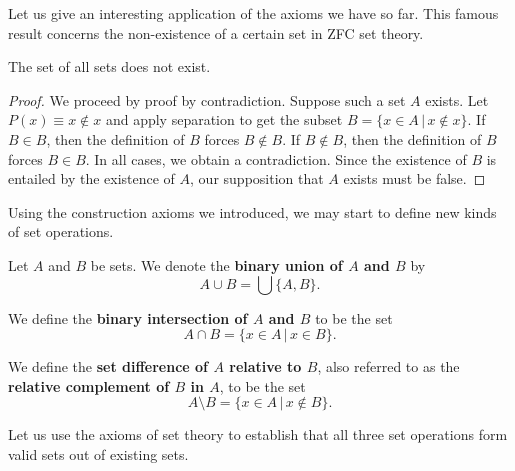 Let us give an interesting application of the axioms we have so far. 
This famous result concerns the non-existence of a certain set in ZFC set theory. 

\begin{prop}
	The set of all sets does not exist.
\end{prop}
\begin{proof}
	We proceed by proof by contradiction. 
	Suppose such a set $A$ exists.
	Let $P(x)\equiv x\notin x$ and apply separation to get the subset $B = \{x\in A \,|\, x\notin x\}$.
	If $B\in B$, then the definition of $B$ forces $B\notin B$.
	If $B\notin B$, then the definition of $B$ forces $B\in B$.
	In all cases, we obtain a contradiction.
	Since the existence of $B$ is entailed by the existence of $A$, our supposition that $A$ exists must be false. 
\end{proof} 

Using the construction axioms we introduced, we may start to define new kinds of set operations. 

\begin{definition}
	Let $A$ and $B$ be sets.
	We denote the \textbf{binary union of $A$ and $B$} by
	\[ A\cup B = \bigcup \{A, B\}. \]
\end{definition}

\begin{definition}
	We define the \textbf{binary intersection of $A$ and $B$} to be the set 
	\[ A\cap B = \{ x\in A \,|\, x\in B \}. \]
\end{definition}

\begin{definition}
	We define the \textbf{set difference of $A$ relative to $B$}, also referred to as the \textbf{relative complement of $B$ in $A$}, to be the set 
	\[ A\setminus B = \{ x\in A \,|\, x\notin B \}. \]
\end{definition}

Let us use the axioms of set theory to establish that all three set operations form valid sets out of existing sets. 

